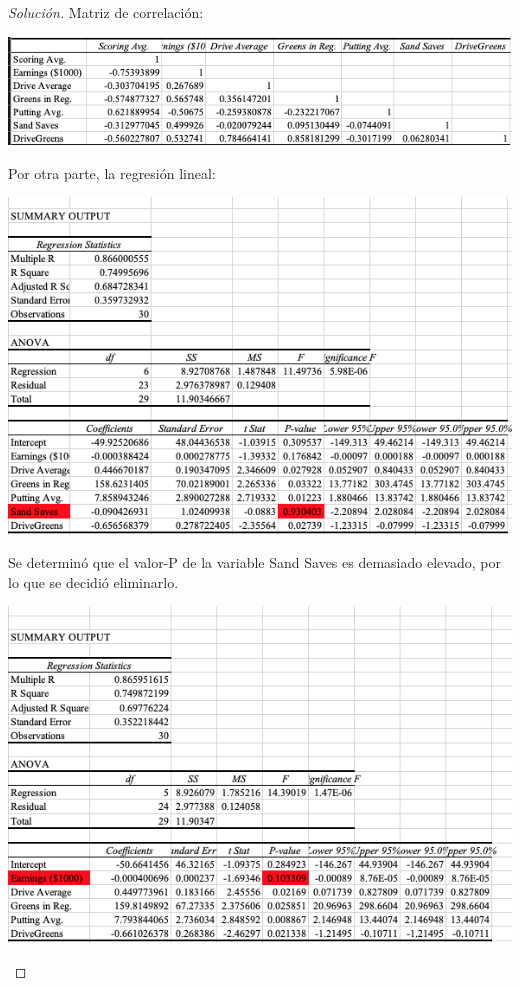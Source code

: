\documentclass[a4paper,12pt]{article}
\newenvironment{solution}
  {\renewcommand\qedsymbol{$\blacksquare$}\begin{proof}[Solución]}
  {\end{proof}}
\begin{document}
\begin{solution}
Matriz de correlación:
\begin{center}
    \includegraphics[scale=0.5]{Imagenes/70-1.png}
\end{center}
Por otra parte, la regresión lineal: 
\begin{center}
    \includegraphics[scale=0.5]{Imagenes/70-3.png}
\end{center}

Se determinó que el valor-P de la variable Sand Saves es demasiado elevado, por lo que se decidió eliminarlo. 

\begin{center}
    \includegraphics[scale=0.5]{Imagenes/70-4.png}
\end{center}


\end{solution}
\end{document}
